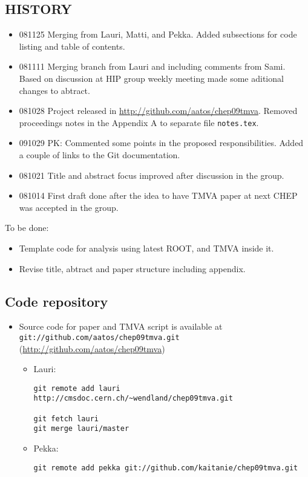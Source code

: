 \begin{appendix}
\subsection{HISTORY}
\begin{itemize}
\item 081125 Merging from Lauri, Matti, and Pekka. 
Added subsections for code listing and table of contents.
\item 081111 Merging branch from Lauri and including comments from Sami. 
Based on discussion at HIP group weekly meeting made some aditional changes to abtract.
\item 081028 Project released in \url{http://github.com/aatos/chep09tmva}. Removed proceedings notes in the Appendix A to separate file {\tt notes.tex}.
\item 091029 PK: Commented some points in the proposed
  responsibilities. Added a couple of links to the Git documentation.
\item 081021 Title and abstract focus improved after discussion in the group. 
\item 081014 First draft done after the idea to have TMVA paper at next CHEP was accepted in the group.
\end{itemize}

To be done:
\begin{itemize}
\item Template code for  analysis using latest ROOT, and TMVA inside it.
\item Revise title, abtract and paper structure including appendix.
\end{itemize}

\subsection{Code repository}
\begin{itemize}
\item Source code for paper and TMVA script  is available at 
{\tt git://github.com/aatos/chep09tmva.git} (\url{http://github.com/aatos/chep09tmva})
\begin{itemize}
\item Lauri:
\begin{verbatim}
git remote add lauri http://cmsdoc.cern.ch/~wendland/chep09tmva.git

git fetch lauri
git merge lauri/master
\end{verbatim}
\item Pekka:
\begin{verbatim}
git remote add pekka git://github.com/kaitanie/chep09tmva.git


\end{verbatim}
\end{itemize}
\end{itemize}
\end{appendix}
